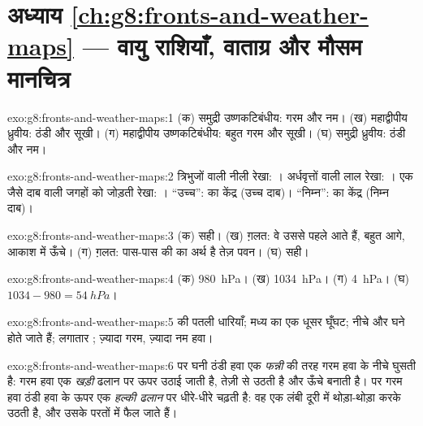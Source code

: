 \section*{अध्याय \ref{ch:g8:fronts-and-weather-maps} --- वायु राशियाँ, वाताग्र और मौसम मानचित्र}

\begin{solution}{exo:g8:fronts-and-weather-maps:1}
(क) समुद्री उष्णकटिबंधीय: गरम और नम। (ख) महाद्वीपीय ध्रुवीय: ठंडी और सूखी।
(ग) महाद्वीपीय उष्णकटिबंधीय: बहुत गरम और सूखी। (घ) समुद्री ध्रुवीय: ठंडी और
नम।
\end{solution}

\begin{solution}{exo:g8:fronts-and-weather-maps:2}
त्रिभुजों वाली नीली रेखा: । अर्धवृत्तों वाली लाल रेखा: । एक जैसे
दाब वाली जगहों को जोड़ती रेखा: । ``उच्च'':  का केंद्र (उच्च दाब)।
``निम्न'':  का केंद्र (निम्न
दाब)।
\end{solution}

\begin{solution}{exo:g8:fronts-and-weather-maps:3}
(क) सही। (ख) ग़लत: वे उससे पहले आते हैं, बहुत आगे, आकाश में ऊँचे। (ग) ग़लत:
पास-पास की  का अर्थ है तेज़ पवन। (घ) सही।
\end{solution}

\begin{solution}{exo:g8:fronts-and-weather-maps:4}
(क) \qty{980}{hPa}। (ख) \qty{1034}{hPa}। (ग) \qty{4}{hPa}। (घ) $1034 -
980 = \qty{54}{hPa}$।
\end{solution}

\begin{solution}{exo:g8:fronts-and-weather-maps:5}
 की पतली धारियाँ; मध्य  का एक धूसर घूँघट;  नीचे और घने होते
जाते हैं; लगातार ; ज़्यादा गरम, ज़्यादा नम हवा।
\end{solution}

\begin{solution}{exo:g8:fronts-and-weather-maps:6}
 पर घनी ठंडी हवा एक \emph{फन्नी} की तरह गरम हवा के नीचे घुसती है: गरम हवा
एक \emph{खड़ी} ढलान पर ऊपर उठाई जाती है, तेज़ी से उठती है और ऊँचे  बनाती है।  पर गरम हवा ठंडी हवा के ऊपर एक \emph{हल्की ढलान} पर धीरे-धीरे चढ़ती है: वह एक
लंबी दूरी में थोड़ा-थोड़ा करके उठती है, और उसके  परतों में फैल
जाते हैं।
\end{solution}

